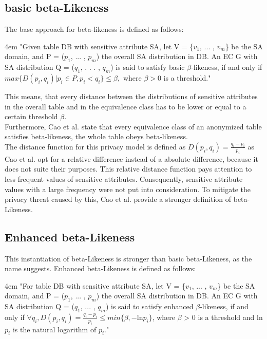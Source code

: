 \documentclass[12pt, a4paper,oneside]{report}
\begin{document}
\subsection{basic beta-Likeness}

The base approach for beta-likeness is defined as follows:\\
\par
\begingroup
\leftskip4em
\rightskip\leftskip
"Given table DB with sensitive attribute SA, let V = \{$v_1$, ... , $v_m$\} be the SA domain, and P = ($p_1$, ... , $p_m$) the overall SA distribution in DB. An EC G with SA distribution Q = ($q_1$, . . . , $q_m$) is said to satisfy basic $\beta$-likeness, if and only if $max\{D(p_i, q_i)|p_i \in P, p_i < q_i\} \le \beta,$ where  $\beta > 0$ is a threshold."\cite{Cao2012}\\
\par
\endgroup

This means, that every distance between the distributions of sensitive attributes in the overall table and in the equivalence class has to be lower or equal to a certain threshold $\beta$.\\
Furthermore, Cao et al. state that every equivalence class of an anonymized table satisfies beta-likeness, the whole table obeys beta-likeness.\\
The distance function for this privacy model is defined as $D(p_i,q_i) = \frac{q_i - p_i}{p_i}$ as Cao et al. opt for a relative difference instead of a absolute difference, because it does not suite their purposes. This relative distance function pays attention to less frequent values of sensitive attributes. Consequently, sensitive attribute values with a large frequency were not put into consideration. To mitigate the privacy threat caused by this, Cao et al. provide a stronger definition of beta-Likeness\cite{Cao2012}.     

\subsection{Enhanced beta-Likeness}

This instantiation of beta-Likeness is stronger than basic beta-Likeness, as the name suggests. Enhanced beta-Likeness is defined as follows:\\

\par
\begingroup
\leftskip4em
\rightskip\leftskip
"For table DB with sensitive attribute SA, let V = \{$v_1$, ... , $v_m$\} be the SA domain, and P = ($p_1$, ... , $p_m$) the overall SA distribution in DB. An EC G with SA distribution Q = ($q_1$, ... , $q_m$) is said to satisfy enhanced $\beta$-likeness, if and only if $\forall q_i, D(p_i, q_i) = \frac{q_i-p_i}{p_i} \le min\{\beta,-\text{ln}p_i\}$, where $\beta$ > 0 is a threshold and ln $p_i$ is the natural logarithm of $p_i$."\cite{Cao2012}\\
\par
\endgroup
\end{document}
